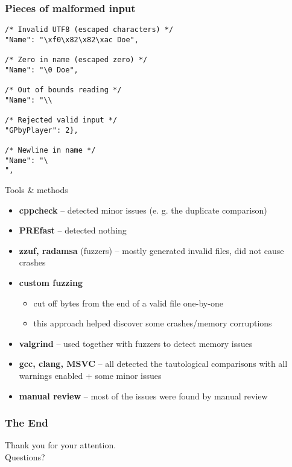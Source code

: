 \documentclass{beamer}
\begin{document}

\begin{frame}[fragile]
\frametitle{Pieces of malformed input}

\begin{lstlisting}[stringstyle=\color{black}]
/* Invalid UTF8 (escaped characters) */
"Name": "\xf0\x82\x82\xac Doe",

/* Zero in name (escaped zero) */
"Name": "\0 Doe",

/* Out of bounds reading */
"Name": "\\

/* Rejected valid input */
"GPbyPlayer": 2},

/* Newline in name */
"Name": "\
",
\end{lstlisting}

\end{frame}

\begin{frame}{Tools \& methods}
\begin{itemize}
\item \textbf{cppcheck} -- detected minor issues (e. g. the duplicate comparison)
\item \textbf{PREfast} -- detected nothing
\item \textbf{zzuf, radamsa} (fuzzers) -- mostly generated invalid files, did not cause crashes
\item \textbf{custom fuzzing}
	\begin{itemize}
	\item cut off bytes from the end of a valid file one-by-one
	\item this approach helped discover some crashes/memory corruptions
	\end{itemize}
\item \textbf{valgrind} -- used together with fuzzers to detect memory issues
\item \textbf{gcc, clang, MSVC} -- all detected the tautological comparisons with all warnings enabled + some minor issues
\item \textbf{manual review} -- most of the issues were found by manual review
\end{itemize}
\end{frame}


\begin{frame}
\frametitle{The End}

\begin{center}
\begin{huge}
Thank you for your attention. \\
Questions?
\end{huge}
\end{center}

\end{frame}
\end{document}

